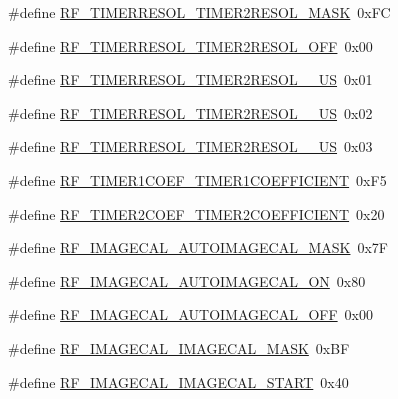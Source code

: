 \begin{DoxyCompactItemize}
\item 
\#define \mbox{\hyperlink{sx1276_regs-_fsk_8h_a23a05da24c57dc8c5b1f512637eb7d35}{R\+F\+\_\+\+T\+I\+M\+E\+R\+R\+E\+S\+O\+L\+\_\+\+T\+I\+M\+E\+R2\+R\+E\+S\+O\+L\+\_\+\+M\+A\+SK}}~0x\+FC
\item 
\#define \mbox{\hyperlink{sx1276_regs-_fsk_8h_a1f0fd645faed2c8357ebb3131369c9ba}{R\+F\+\_\+\+T\+I\+M\+E\+R\+R\+E\+S\+O\+L\+\_\+\+T\+I\+M\+E\+R2\+R\+E\+S\+O\+L\+\_\+\+O\+FF}}~0x00
\item 
\#define \mbox{\hyperlink{sx1276_regs-_fsk_8h_aaeb97a29ba9389511206598948f2b544}{R\+F\+\_\+\+T\+I\+M\+E\+R\+R\+E\+S\+O\+L\+\_\+\+T\+I\+M\+E\+R2\+R\+E\+S\+O\+L\+\_\+\_\+\+US}}~0x01
\item 
\#define \mbox{\hyperlink{sx1276_regs-_fsk_8h_a0c4dd1dabb1862f2898d6b2460c59c8d}{R\+F\+\_\+\+T\+I\+M\+E\+R\+R\+E\+S\+O\+L\+\_\+\+T\+I\+M\+E\+R2\+R\+E\+S\+O\+L\+\_\+\_\+\+US}}~0x02
\item 
\#define \mbox{\hyperlink{sx1276_regs-_fsk_8h_a565fce371ac9705658e6932916c3768a}{R\+F\+\_\+\+T\+I\+M\+E\+R\+R\+E\+S\+O\+L\+\_\+\+T\+I\+M\+E\+R2\+R\+E\+S\+O\+L\+\_\+\_\+\+US}}~0x03
\item 
\#define \mbox{\hyperlink{sx1276_regs-_fsk_8h_a8718af4d7f55436a3c9376964556c42f}{R\+F\+\_\+\+T\+I\+M\+E\+R1\+C\+O\+E\+F\+\_\+\+T\+I\+M\+E\+R1\+C\+O\+E\+F\+F\+I\+C\+I\+E\+NT}}~0x\+F5
\item 
\#define \mbox{\hyperlink{sx1276_regs-_fsk_8h_a815c5b653da11e17f1973a36f7e83fc6}{R\+F\+\_\+\+T\+I\+M\+E\+R2\+C\+O\+E\+F\+\_\+\+T\+I\+M\+E\+R2\+C\+O\+E\+F\+F\+I\+C\+I\+E\+NT}}~0x20
\item 
\#define \mbox{\hyperlink{sx1276_regs-_fsk_8h_a3a8677759e03ebc17657dae4e83ee3e6}{R\+F\+\_\+\+I\+M\+A\+G\+E\+C\+A\+L\+\_\+\+A\+U\+T\+O\+I\+M\+A\+G\+E\+C\+A\+L\+\_\+\+M\+A\+SK}}~0x7F
\item 
\#define \mbox{\hyperlink{sx1276_regs-_fsk_8h_a89ea44c76e321418f15421277a3ec28f}{R\+F\+\_\+\+I\+M\+A\+G\+E\+C\+A\+L\+\_\+\+A\+U\+T\+O\+I\+M\+A\+G\+E\+C\+A\+L\+\_\+\+ON}}~0x80
\item 
\#define \mbox{\hyperlink{sx1276_regs-_fsk_8h_a1d28367a9a8e92bb14f6cdf8347d581d}{R\+F\+\_\+\+I\+M\+A\+G\+E\+C\+A\+L\+\_\+\+A\+U\+T\+O\+I\+M\+A\+G\+E\+C\+A\+L\+\_\+\+O\+FF}}~0x00
\item 
\#define \mbox{\hyperlink{sx1276_regs-_fsk_8h_a93dde986266fcd5b36345279f7eb2307}{R\+F\+\_\+\+I\+M\+A\+G\+E\+C\+A\+L\+\_\+\+I\+M\+A\+G\+E\+C\+A\+L\+\_\+\+M\+A\+SK}}~0x\+BF
\item 
\#define \mbox{\hyperlink{sx1276_regs-_fsk_8h_af1223b6f247482b1d7327c213b8b0864}{R\+F\+\_\+\+I\+M\+A\+G\+E\+C\+A\+L\+\_\+\+I\+M\+A\+G\+E\+C\+A\+L\+\_\+\+S\+T\+A\+RT}}~0x40

\end{DoxyCompactItemize}
